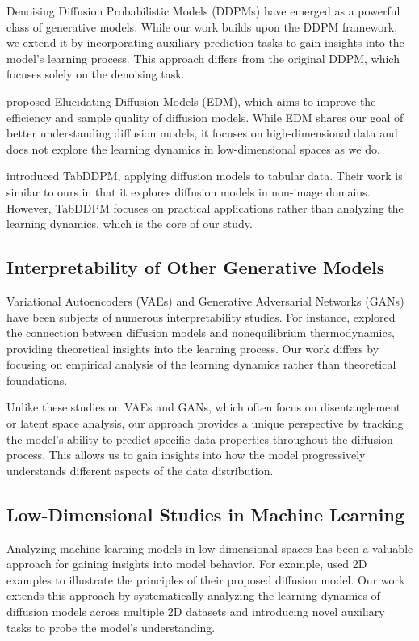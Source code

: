 \documentclass{article} %
\begin{document}
Denoising Diffusion Probabilistic Models (DDPMs) \citep{ddpm} have emerged as a powerful class of generative models. While our work builds upon the DDPM framework, we extend it by incorporating auxiliary prediction tasks to gain insights into the model's learning process. This approach differs from the original DDPM, which focuses solely on the denoising task.

\citet{edm} proposed Elucidating Diffusion Models (EDM), which aims to improve the efficiency and sample quality of diffusion models. While EDM shares our goal of better understanding diffusion models, it focuses on high-dimensional data and does not explore the learning dynamics in low-dimensional spaces as we do.

\citet{kotelnikov2022tabddpm} introduced TabDDPM, applying diffusion models to tabular data. Their work is similar to ours in that it explores diffusion models in non-image domains. However, TabDDPM focuses on practical applications rather than analyzing the learning dynamics, which is the core of our study.

\subsection{Interpretability of Other Generative Models}

Variational Autoencoders (VAEs) \citep{vae} and Generative Adversarial Networks (GANs) \citep{gan} have been subjects of numerous interpretability studies. For instance, \citet{pmlr-v37-sohl-dickstein15} explored the connection between diffusion models and nonequilibrium thermodynamics, providing theoretical insights into the learning process. Our work differs by focusing on empirical analysis of the learning dynamics rather than theoretical foundations.

Unlike these studies on VAEs and GANs, which often focus on disentanglement or latent space analysis, our approach provides a unique perspective by tracking the model's ability to predict specific data properties throughout the diffusion process. This allows us to gain insights into how the model progressively understands different aspects of the data distribution.

\subsection{Low-Dimensional Studies in Machine Learning}

Analyzing machine learning models in low-dimensional spaces has been a valuable approach for gaining insights into model behavior. For example, \citet{pmlr-v37-sohl-dickstein15} used 2D examples to illustrate the principles of their proposed diffusion model. Our work extends this approach by systematically analyzing the learning dynamics of diffusion models across multiple 2D datasets and introducing novel auxiliary tasks to probe the model's understanding.
\end{document}
